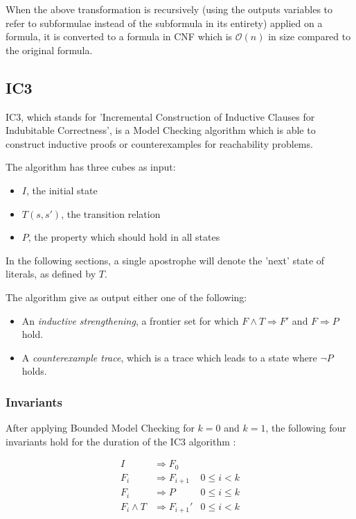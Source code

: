 \documentclass[a4paper]{article}
\begin{document}
When the above transformation is recursively (using the outputs variables to refer to subformulae instead of the subformula in its entirety) applied on a formula, it is converted to a formula in CNF which is $\mathcal{O}(n)$ in size compared to the original formula.

\subsection{IC3}
IC3, which stands for 'Incremental Construction of Inductive Clauses for Indubitable Correctness', is a Model Checking algorithm which is able to construct inductive proofs or counterexamples for reachability problems.

The algorithm has three cubes as input:
\begin{itemize}
\item $I$, the initial state
\item $T(s,s')$, the transition relation
\item $P$, the property which should hold in all states
\end{itemize}

In the following sections, a single apostrophe will denote the 'next' state of literals, as defined by $T$.

The algorithm give as output either one of the following:
\begin{itemize}
\item An \emph{inductive strengthening}, a frontier set for which $F \land T \Rightarrow F'$ and $F \Rightarrow P$ hold.
\item A \emph{counterexample trace}, which is a trace which leads to a state where $\lnot P$ holds.
\end{itemize}

\subsubsection{Invariants}
After applying Bounded Model Checking for $k=0$ and $k=1$, the following four invariants hold for the duration of the IC3 algorithm \cite{Bradley2011}:

\setcounter{equation}{0}
\begin{align}
I &\Rightarrow F_0\\
F_i &\Rightarrow F_{i+1} & 0 \leq i < k\\
F_i &\Rightarrow P & 0 \leq i \leq k\\
F_i \land T &\Rightarrow F_{i+1}' & 0 \leq i < k
\end{align}
\end{document}
